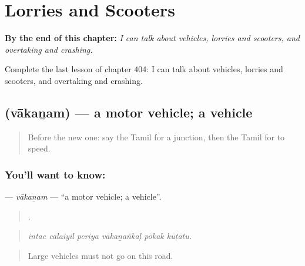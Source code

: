 
\chapter{Lorries and Scooters}
\label{ch:ta-lorries-and-scooters}

\begin{chapteropening}
\textbf{By the end of this chapter:} \emph{I can talk about vehicles, lorries and scooters, and overtaking and crashing.}

Complete the last lesson of chapter 404: I can talk about vehicles, lorries and scooters, and overtaking and crashing.
\end{chapteropening}

\section[\texorpdfstring{\ta{வாகனம்} (vākaṉam)}{வாகனம் (vākaṉam)}]{ (vākaṉam) — a motor vehicle; a vehicle}

\label{lesson:TA-C404-vakanam}



\begin{quote}
Before the new one: say the Tamil for a junction, then the Tamil for to speed.
\end{quote}

\subsection*{You'll want to know: }
\textbf{} — \emph{vākaṉam} — \textquotedblleft{}a motor vehicle; a vehicle\textquotedblright{}.

\begin{quote}
     .
\end{quote}

\begin{quote}
\emph{intac cālaiyil periya vākaṉaṅkaḷ pōkak kūṭātu.}
\end{quote}

\begin{quote}
Large vehicles must not go on this road.
\end{quote}

